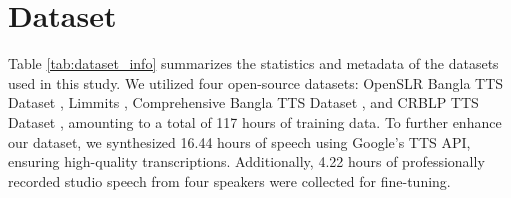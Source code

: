 

\section{Dataset}
\label{app:dataset}




Table \ref{tab:dataset_info} summarizes the statistics and metadata of the datasets used in this study. We utilized four open-source datasets: OpenSLR Bangla TTS Dataset \cite{openslr_tts}, Limmits \cite{limmits24}, Comprehensive Bangla TTS Dataset \cite{com_tts}, and CRBLP TTS Dataset \cite{alam2007text}, amounting to a total of 117 hours of training data. To further enhance our dataset, we synthesized 16.44 hours of speech using Google’s TTS API, ensuring high-quality transcriptions. Additionally, 4.22 hours of professionally recorded studio speech from four speakers were collected for fine-tuning.

